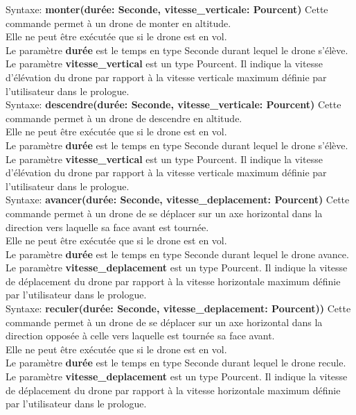 \documentclass[12pt]{article}
\begin{document}
		\quad Syntaxe: \textbf{monter(durée: Seconde, vitesse\_verticale: Pourcent)} \bigbreak
			Cette commande permet à un drone de monter en altitude. \\
			Elle ne peut être exécutée que si le drone est en vol. \\
			Le paramètre \textbf{durée} est le temps en type Seconde durant lequel le drone s'élève. \\
			Le paramètre \textbf{vitesse\_vertical} est un type Pourcent. Il indique la vitesse d'élévation du drone par rapport à la vitesse verticale maximum définie par l'utilisateur dans le prologue. \\

		\newpage
		\quad Syntaxe: \textbf{descendre(durée: Seconde, vitesse\_verticale: Pourcent)} \bigbreak
			Cette commande permet à un drone de descendre en altitude. \\
			Elle ne peut être exécutée que si le drone est en vol.\\
			Le paramètre \textbf{durée} est le temps en type Seconde durant lequel le drone s'élève. \\
			Le paramètre \textbf{vitesse\_vertical} est un type Pourcent. Il indique la vitesse d'élévation du drone par rapport à la vitesse verticale maximum définie par l'utilisateur dans le prologue. \\

		
		\quad Syntaxe: \textbf{avancer(durée: Seconde, vitesse\_deplacement: Pourcent)}  \bigbreak
			Cette commande permet à un drone de se déplacer sur un axe horizontal dans la direction vers laquelle sa face avant est tournée. \\
			Elle ne peut être exécutée que si le drone est en vol.\\
			Le paramètre \textbf{durée} est le temps en type Seconde durant lequel le drone avance. \\
			Le paramètre \textbf{vitesse\_deplacement} est un type Pourcent. Il indique la vitesse de déplacement du drone par rapport à la vitesse horizontale maximum définie par l'utilisateur dans le prologue.  \\


		\quad Syntaxe: \textbf{reculer(durée: Seconde, vitesse\_deplacement: Pourcent))}  \bigbreak
			Cette commande permet à un drone de se déplacer sur un axe horizontal dans la direction opposée à celle vers laquelle est tournée sa face avant. \\
			Elle ne peut être exécutée que si le drone est en vol.\\
			Le paramètre \textbf{durée} est le temps en type Seconde durant lequel le drone recule. \\
			Le paramètre \textbf{vitesse\_deplacement} est un type Pourcent. Il indique la vitesse de déplacement du drone par rapport à la vitesse horizontale maximum définie par l'utilisateur dans le prologue.  \\
\end{document}
